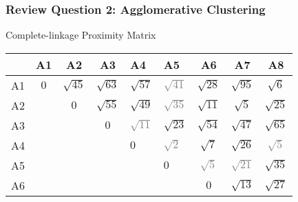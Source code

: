\documentclass[aspectratio=169, 10pt]{beamer}
\begin{document}
\begin{frame}[t]
    \frametitle{Review Question 2: Agglomerative Clustering}
    \small

    Complete-linkage Proximity Matrix


    \begin{table}[]
        \scriptsize
        \begin{tabular}{c|cccggccc}
                                                        & A1  & A2          & A3          & A4                                 & A5                                 & A6                                & A7                                 & A8                                 \\ \hline
        A1                                              & $0$ & $\sqrt{45}$ & $\sqrt{63}$ & {\color[HTML]{3531FF} $\sqrt{57}$} & \textcolor{gray}{$\sqrt{41}$} & $\sqrt{28}$                       & $\sqrt{95}$                        & $\sqrt{6}$                         \\
        A2                                              &     & $0$         & $\sqrt{55}$ & {\color[HTML]{3531FF} $\sqrt{49}$} & \textcolor{gray}{$\sqrt{35}$} & $\sqrt{11}$                       & $\sqrt{5}$                         & $\sqrt{25}$                        \\
        A3                                              &     &             & $0$         & \textcolor{gray}{$\sqrt{11}$} & {\color[HTML]{3531FF} $\sqrt{23}$} & $\sqrt{54}$                       & $\sqrt{47}$                        & $\sqrt{65}$                        \\
        A4                       &     &             &             & {\color[HTML]{3531FF} $0$}         & \textcolor{gray}{$\sqrt{2}$}  & {\color[HTML]{3531FF} $\sqrt{7}$} & {\color[HTML]{3531FF} $\sqrt{26}$} & \textcolor{gray}{$\sqrt{5}$}  \\
        A5                       &     &             &             &                                    & {\color[HTML]{3531FF} $0$}         & \textcolor{gray}{$\sqrt{5}$} & \textcolor{gray}{$\sqrt{21}$} & {\color[HTML]{3531FF} $\sqrt{35}$} \\
        A6                                              &     &             &             &                                    &                                    & $0$                               & $\sqrt{13}$                        & $\sqrt{27}$                        \\

\end{tabular}
\end{table}
\end{frame}
\end{document}

